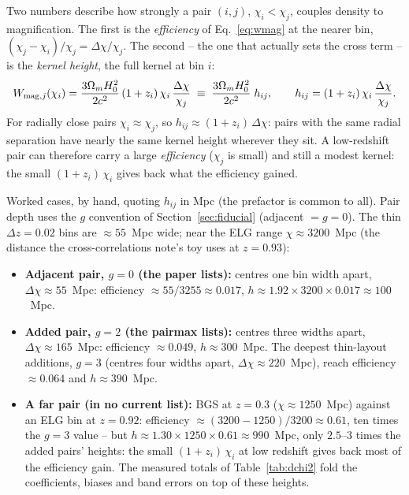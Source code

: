 \documentclass[11pt]{article}
\begin{document}
Two numbers describe how strongly a pair $(i, j)$, $\chi_i < \chi_j$,
couples density to magnification.  The first is the \emph{efficiency}
of Eq.~\eqref{eq:wmag} at the nearer bin,
$(\chi_j - \chi_i)/\chi_j = \Delta\chi/\chi_j$.  The second -- the one
that actually sets the cross term -- is the \emph{kernel height},
the full kernel at bin $i$:
\begin{equation}
  W_{{\rm mag},j}(\chi_i)
  = \frac{3\Omega_m H_0^2}{2c^2}\,(1 + z_i)\,\chi_i\,
    \frac{\Delta\chi}{\chi_j}
  \;\equiv\; \frac{3\Omega_m H_0^2}{2c^2}\; h_{ij},
  \qquad
  h_{ij} = (1 + z_i)\,\chi_i\,\frac{\Delta\chi}{\chi_j} .
  \label{eq:height}
\end{equation}
For radially close pairs $\chi_i \approx \chi_j$, so
$h_{ij} \approx (1 + z_i)\,\Delta\chi$: pairs with the same radial
separation have nearly the same kernel height wherever they sit.  A
low-redshift pair can therefore carry a large \emph{efficiency}
($\chi_j$ is small) and still a modest kernel: the small
$(1 + z_i)\,\chi_i$ gives back what the efficiency gained.

Worked cases, by hand, quoting $h_{ij}$ in Mpc (the prefactor is
common to all).  Pair depth uses the $g$ convention of
Section~\ref{sec:fiducial} (adjacent $= g = 0$).  The thin
$\Delta z = 0.02$ bins are $\approx 55$~Mpc wide; near the ELG range
$\chi \approx 3200$~Mpc (the distance the cross-correlations note's
toy uses at $z = 0.93$):

\begin{itemize}
\item \textbf{Adjacent pair, $g = 0$ (the paper lists):} centres one
  bin width apart, $\Delta\chi \approx 55$~Mpc:
  efficiency $\approx 55/3255 \approx 0.017$,
  $h \approx 1.92 \times 3200 \times 0.017 \approx 100$~Mpc.
\item \textbf{Added pair, $g = 2$ (the pairmax lists):} centres three
  widths apart, $\Delta\chi \approx 165$~Mpc:
  efficiency $\approx 0.049$, $h \approx 300$~Mpc.  The deepest
  thin-layout additions, $g = 3$ (centres four widths apart,
  $\Delta\chi \approx 220$~Mpc), reach efficiency $\approx 0.064$ and
  $h \approx 390$~Mpc.
\item \textbf{A far pair (in no current list):} BGS at $z = 0.3$
  ($\chi \approx 1250$~Mpc) against an ELG bin at $z = 0.92$:
  efficiency $\approx (3200 - 1250)/3200 \approx 0.61$, ten times the
  $g = 3$ value -- but
  $h \approx 1.30 \times 1250 \times 0.61 \approx 990$~Mpc, only
  $2.5$--$3$ times the added pairs' heights: the small
  $(1+z_i)\,\chi_i$ at low redshift gives back most of the
  efficiency gain.  The measured totals of
  Table~\ref{tab:dchi2} fold the coefficients, biases and band
  errors on top of these heights.
\end{itemize}
\end{document}
